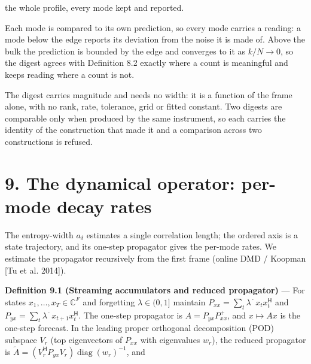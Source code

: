 \documentclass[10pt,letterpaper,twocolumn]{article}
\begin{document}

the whole profile, every mode kept and reported.

Each mode is compared to its own prediction, so every mode carries a reading: a mode below the edge reports its deviation from the noise it is made of. Above the bulk the prediction is bounded by the edge and converges to it as \(k/N\to 0\), so the digest agrees with Definition 8.2 exactly where a count is meaningful and keeps reading where a count is not.

The digest carries magnitude and needs no width: it is a function of the frame alone, with no rank, rate, tolerance, grid or fitted constant. Two digests are comparable only when produced by the same instrument, so each carries the identity of the construction that made it and a comparison across two constructions is refused.

\section{9. The dynamical operator: per-mode decay rates}\label{9-the-dynamical-operator-per-mode-decay-rates}

The entropy-width \(a_\delta\) estimates a single correlation length; the ordered axis is a state trajectory, and its one-step propagator gives the per-mode rates. We estimate the propagator recursively from the first frame (online DMD / Koopman {[}Tu et al. 2014{]}).

\textbf{Definition 9.1 (Streaming accumulators and reduced propagator)} --- For states \(x_1,\dots,x_T\in\mathbb{C}^F\) and forgetting \(\lambda\in(0,1]\) maintain \(P_{xx}=\sum_t \lambda^{\,\cdot}\,x_t x_t^{\mathsf H}\) and \(P_{yx}=\sum_t \lambda^{\,\cdot}\,x_{t+1} x_t^{\mathsf H}\). The one-step propagator is \(A=P_{yx}P_{xx}^{+}\), and \(x\mapsto Ax\) is the one-step forecast. In the leading proper orthogonal decomposition (POD) subspace \(V_r\) (top eigenvectors of \(P_{xx}\) with eigenvalues \(w_r\)), the reduced propagator is \(\tilde A=(V_r^{\mathsf H} P_{yx}V_r)\operatorname{diag}(w_r)^{-1}\), and

\end{document}
